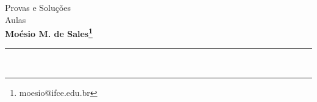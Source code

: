 \documentclass[13pt,a4paper]{article}
\makeatletter
\newcommand{\nome}{\bf Moésio M. de Sales\footnote{moesio@ifce.edu.br}}
\newcommand{\titu}{Provas e Soluções}
\newcommand{\disc}{Aulas}
\makeatother
\begin{document}
{\Large
\begin{center} \titu\\ \disc\\  \nome\end{center}
}
\hfill   %
\hrule\ 




\printbibliography
\listoftodos[Notes]
\end{document}
